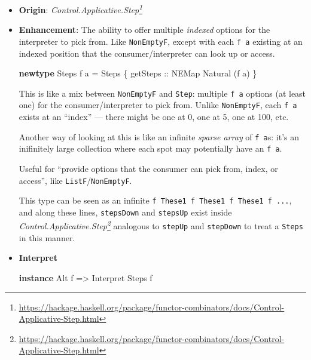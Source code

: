 \documentclass[]{article}
\newenvironment{Shaded}{}{}
\newcommand{\DataTypeTok}[1]{\textcolor[rgb]{0.56,0.13,0.00}{#1}}
\newcommand{\KeywordTok}[1]{\textcolor[rgb]{0.00,0.44,0.13}{\textbf{#1}}}
\newcommand{\NormalTok}[1]{#1}
\newcommand{\OtherTok}[1]{\textcolor[rgb]{0.00,0.44,0.13}{#1}}
\renewcommand{\href}[2]{#2\footnote{\url{#1}}}
\begin{document}
\begin{itemize}
\item
  \textbf{Origin}:
  \emph{\href{https://hackage.haskell.org/package/functor-combinators/docs/Control-Applicative-Step.html}{Control.Applicative.Step}}
\item
  \textbf{Enhancement}: The ability to offer multiple \emph{indexed} options for
  the interpreter to pick from. Like \texttt{NonEmptyF}, except with each
  \texttt{f\ a} existing at an indexed position that the consumer/interpreter
  can look up or access.

\begin{Shaded}
\begin{Highlighting}[]
\KeywordTok{newtype} \DataTypeTok{Steps}\NormalTok{ f a }\OtherTok{=} \DataTypeTok{Steps}\NormalTok{ \{}\OtherTok{ getSteps ::} \DataTypeTok{NEMap} \DataTypeTok{Natural}\NormalTok{ (f a) \}}
\end{Highlighting}
\end{Shaded}

  This is like a mix between \texttt{NonEmptyF} and \texttt{Step}: multiple
  \texttt{f\ a} options (at least one) for the consumer/interpreter to pick
  from. Unlike \texttt{NonEmptyF}, each \texttt{f\ a} exists at an ``index'' ---
  there might be one at 0, one at 5, one at 100, etc.

  Another way of looking at this is like an infinite \emph{sparse array} of
  \texttt{f\ a}s: it's an inifinitely large collection where each spot may
  potentially have an \texttt{f\ a}.

  Useful for ``provide options that the consumer can pick from, index, or
  access'', like \texttt{ListF}/\texttt{NonEmptyF}.

  This type can be seen as an infinite
  \texttt{f\ \textasciigrave{}These1\textasciigrave{}\ f\ \textasciigrave{}These1\textasciigrave{}\ f\ \textasciigrave{}These1\textasciigrave{}\ f\ ...},
  and along these lines, \texttt{stepsDown} and \texttt{stepsUp} exist inside
  \emph{\href{https://hackage.haskell.org/package/functor-combinators/docs/Control-Applicative-Step.html}{Control.Applicative.Step}}
  analogous to \texttt{stepUp} and \texttt{stepDown} to treat a \texttt{Steps}
  in this manner.
\item
  \textbf{Interpret}

\begin{Shaded}
\begin{Highlighting}[]
\KeywordTok{instance} \DataTypeTok{Alt}\NormalTok{ f }\OtherTok{=\textgreater{}} \DataTypeTok{Interpret} \DataTypeTok{Steps}\NormalTok{ f}


\end{Highlighting}
\end{Shaded}
\end{itemize}
\end{document}
